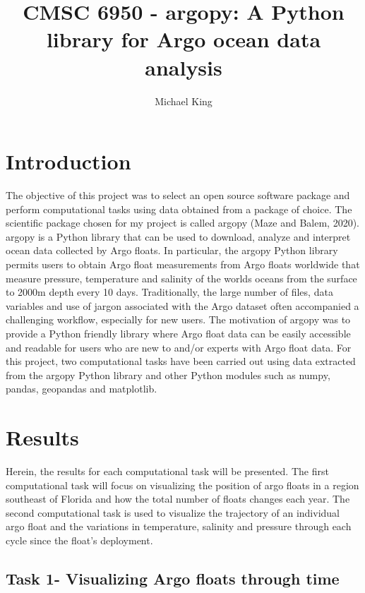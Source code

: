 \documentclass{article}
\title{CMSC 6950 - argopy: A Python library for Argo ocean data analysis}
\author{Michael King}
\begin{document}
\maketitle

\section{Introduction}

The objective of this project was to select an open source software package and perform computational tasks using data obtained from a package of choice. The scientific package chosen for my project is called argopy (Maze and Balem, 2020). argopy is a Python library that can be used to download, analyze and interpret ocean data collected by Argo floats. In particular, the argopy Python library permits users to obtain Argo float measurements from Argo floats worldwide that measure pressure, temperature and salinity of the worlds oceans from the surface to 2000m depth every 10 days. Traditionally, the large number of files, data variables and use of jargon associated with the Argo dataset often accompanied a challenging workflow, especially for new users. The motivation of argopy was to provide a Python friendly library where Argo float data can be easily accessible and readable for users who are new to and/or experts with Argo float data. For this project, two computational tasks have been carried out using data extracted from the argopy Python library and other Python modules such as numpy, pandas, geopandas and matplotlib. 

    

\section{Results}

Herein, the results for each computational task will be presented. The first computational task will focus on visualizing the position of argo floats in a region southeast of Florida and how the total number of floats changes each year. The second computational task is used to visualize the trajectory of an individual argo float and the variations in temperature, salinity and pressure through each cycle since the float's deployment.

\subsection{Task 1- Visualizing Argo floats through time}
\end{document}
